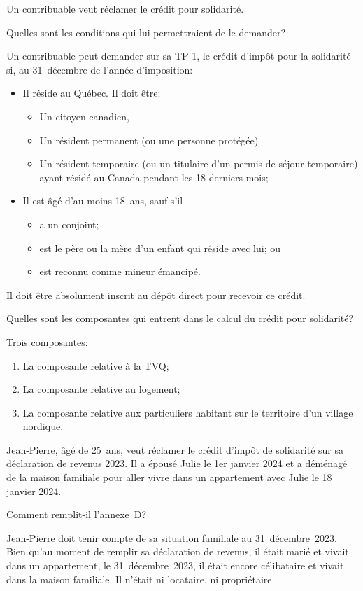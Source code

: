 \begin{question}
	Un contribuable veut réclamer le crédit pour solidarité. 
	
	Quelles sont les conditions qui lui permettraient de le demander?
\end{question}
Un contribuable peut demander sur sa TP-1, le crédit d'impôt pour la solidarité si, au 31~décembre de l'année d'imposition:
\begin{itemize}
	\item Il réside au Québec. Il doit être:
	\begin{itemize}
		\item Un citoyen canadien,
		\item Un résident permanent (ou une personne protégée)
		\item Un résident temporaire (ou un titulaire d'un permis de séjour temporaire) ayant résidé au Canada pendant les 18 derniers mois;
	\end{itemize}
	\item Il est âgé d'au moins 18~ans, sauf s'il
	\begin{itemize}
		\item a un conjoint;
		\item est le père ou la mère d'un enfant qui réside avec lui; ou
		\item est reconnu comme mineur émancipé.
	\end{itemize} 
\end{itemize}

Il doit être absolument inscrit au dépôt direct pour recevoir ce crédit.

\begin{question}
	Quelles sont les composantes qui entrent dans le calcul du crédit pour solidarité?
\end{question}
Trois composantes:
\begin{enumerate}
	\item La composante relative à la TVQ;
	\item La composante relative au logement;
	\item La composante relative aux particuliers habitant sur le territoire d'un village nordique.
\end{enumerate}


\begin{question}
	Jean-Pierre, âgé de 25~ans, veut réclamer le crédit d'impôt de solidarité sur sa déclaration de revenus 2023. Il a épousé Julie le 1er janvier 2024 et a déménagé de la maison familiale pour aller vivre dans un appartement avec Julie le 18 janvier 2024. 
	
	Comment remplit-il l'annexe~D?
\end{question}
Jean-Pierre doit tenir compte de sa situation familiale au 31~décembre~2023.
Bien qu'au moment de remplir sa déclaration de revenus, il était marié et vivait dans un appartement, le 31~décembre~2023, il était encore célibataire et vivait dans la maison familiale. Il n'était ni locataire, ni propriétaire. 

